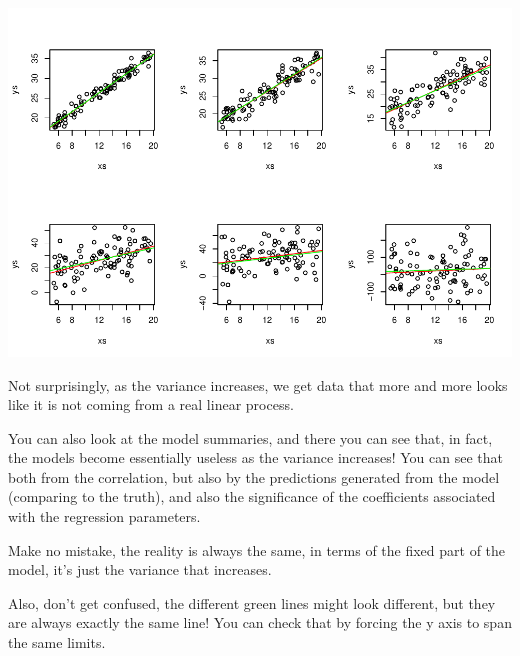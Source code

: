 \documentclass[
]{book}
\begin{document}
\includegraphics{ECOMODbook_files/figure-latex/a6.27-1.pdf}

Not surprisingly, as the variance increases, we get data that more and more looks like it is not coming from a real linear process.

You can also look at the model summaries, and there you can see that, in fact, the models become essentially useless as the variance increases! You can see that both from the correlation, but also by the predictions generated from the model (comparing to the truth), and also the significance of the coefficients associated with the regression parameters.

Make no mistake, the reality is always the same, in terms of the fixed part of the model, it's just the variance that increases.

Also, don't get confused, the different green lines might look different, but they are always exactly the same line! You can check that by forcing the y axis to span the same limits.
\end{document}
